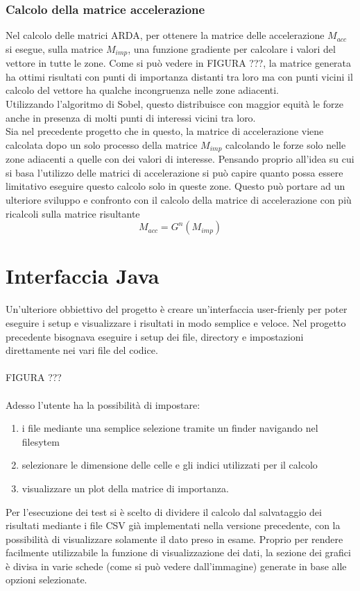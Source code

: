 \subsubsection{Calcolo della matrice accelerazione}
Nel calcolo delle matrici ARDA, per ottenere la matrice delle accelerazione $M_{acc}$ si esegue, sulla
matrice $M_{imp}$, una funzione gradiente per calcolare i valori del vettore in tutte le zone. Come si pu\`o
vedere in FIGURA ???, la matrice generata ha ottimi risultati con punti di importanza distanti tra loro
ma con punti vicini il calcolo del vettore ha qualche incongruenza nelle zone adiacenti.\\
Utilizzando l'algoritmo di Sobel, questo distribuisce con maggior equit\`a le forze anche in presenza di
molti punti di interessi vicini tra loro.\\
Sia nel precedente progetto che in questo, la matrice di accelerazione viene calcolata dopo un solo processo
della matrice $M_{imp}$ calcolando le forze solo nelle zone adiacenti a quelle con dei valori di interesse.
Pensando proprio all'idea su cui si basa l'utilizzo delle matrici di accelerazione si pu\`o capire quanto possa
essere limitativo eseguire questo calcolo solo in queste zone. Questo pu\`o portare ad un ulteriore sviluppo e
confronto con il calcolo della matrice di accelerazione con pi\`u ricalcoli sulla matrice risultante
\begin{equation}
M_{acc} = G^{n}(M_{imp})
\end{equation}

\section{Interfaccia Java}
Un'ulteriore obbiettivo del progetto \`e creare un'interfaccia user-frienly per poter eseguire i setup e visualizzare
i risultati in modo semplice e veloce. Nel progetto precedente bisognava eseguire i setup dei file,
directory e impostazioni direttamente nei vari file del codice.\\
\\
FIGURA ???\\
\\
Adesso l'utente ha la possibilit\`a di impostare:
\begin{enumerate}
    \item i file mediante una semplice selezione tramite un finder navigando nel filesytem
    \item selezionare le dimensione delle celle e gli indici utilizzati per il calcolo
    \item visualizzare un plot della matrice di importanza.
\end{enumerate}
Per l'esecuzione dei test si \`e scelto di dividere il calcolo dal salvataggio dei risultati mediante i file CSV
gi\`a implementati nella versione precedente, con la possibilit\`a di visualizzare solamente il dato preso in esame.
Proprio per rendere facilmente utilizzabile la funzione di visualizzazione dei dati, la sezione dei grafici \`e
divisa in varie schede (come si pu\`o vedere dall'immagine) generate in base alle opzioni selezionate.


